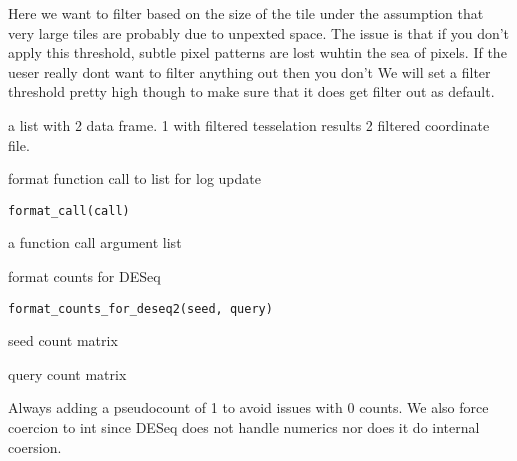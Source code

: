 \documentclass[a4paper]{book}
\begin{document}
%
\begin{Details}
Here we want to filter based on the size of the tile
under the assumption that very large tiles are probably due to 
unpexted space. The issue is that if you don't apply this threshold,
subtle pixel patterns are lost wuhtin the sea of pixels. 
If the ueser really dont want to filter anything out then you don't
We will set a filter threshold pretty high though to make sure 
that it does get filter out as default.
\end{Details}
%
\begin{Value}
a list with 2 data frame. 1 with filtered tesselation results
2 filtered coordinate file.
\end{Value}
%
\begin{Description}
format function call to list for log update
\end{Description}
%
\begin{Usage}
\begin{verbatim}
format_call(call)
\end{verbatim}
\end{Usage}
%
\begin{Arguments}
\begin{ldescription}
\item[\code{call}] a function call argument list
\end{ldescription}
\end{Arguments}
%
\begin{Description}
format counts for DESeq
\end{Description}
%
\begin{Usage}
\begin{verbatim}
format_counts_for_deseq2(seed, query)
\end{verbatim}
\end{Usage}
%
\begin{Arguments}
\begin{ldescription}
\item[\code{seed}] seed count matrix

\item[\code{query}] query count matrix
\end{ldescription}
\end{Arguments}
%
\begin{Details}
Always adding a pseudocount of 1 to avoid issues
with 0 counts. We also force coercion to int since DESeq does
not handle numerics nor does it do internal coersion.
\end{Details}
\end{document}
